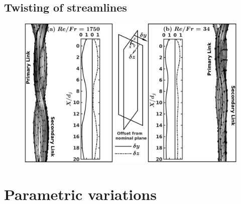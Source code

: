 \documentclass[%
aip,
sd,%
amsmath,amssymb,
preprint,%
author-year,%
]{revtex4-1}
\begin{document}
\subsection{Twisting of streamlines}
\lipsum[1]
\begin{figure}
	\centering
	\includegraphics[width=\linewidth]{fig1}
	\caption{}
	\label{Figure::stream}
\end{figure}
\lipsum[1]
\section{Parametric variations}
\end{document}
